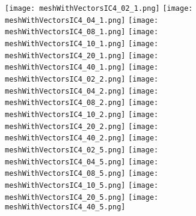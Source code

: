 \documentclass{InsightArticle}
\begin{document}
\begin{figure}
\center
\texttt{[image: meshWithVectorsIC4\_02\_1.png]}
\texttt{[image: meshWithVectorsIC4\_04\_1.png]}
\texttt{[image: meshWithVectorsIC4\_08\_1.png]}
\texttt{[image: meshWithVectorsIC4\_10\_1.png]}
\texttt{[image: meshWithVectorsIC4\_20\_1.png]}
\texttt{[image: meshWithVectorsIC4\_40\_1.png]}
\texttt{[image: meshWithVectorsIC4\_02\_2.png]}
\texttt{[image: meshWithVectorsIC4\_04\_2.png]}
\texttt{[image: meshWithVectorsIC4\_08\_2.png]}
\texttt{[image: meshWithVectorsIC4\_10\_2.png]}
\texttt{[image: meshWithVectorsIC4\_20\_2.png]}
\texttt{[image: meshWithVectorsIC4\_40\_2.png]}
\texttt{[image: meshWithVectorsIC4\_02\_5.png]}
\texttt{[image: meshWithVectorsIC4\_04\_5.png]}
\texttt{[image: meshWithVectorsIC4\_08\_5.png]}
\texttt{[image: meshWithVectorsIC4\_10\_5.png]}
\texttt{[image: meshWithVectorsIC4\_20\_5.png]}
\texttt{[image: meshWithVectorsIC4\_40\_5.png]}
\label{fig:VectorIC4Smoothings}
\end{figure}

\clearpage



%
%



\end{document}
